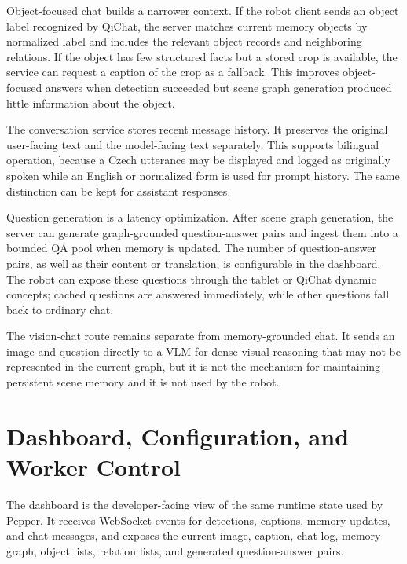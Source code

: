 Object-focused chat builds a narrower context.
If the robot client sends an object label recognized by QiChat, the server matches current memory objects by normalized label and includes the relevant object records and neighboring relations.
If the object has few structured facts but a stored crop is available, the service can request a caption of the crop as a fallback.
This improves object-focused answers when detection succeeded but scene graph generation produced little information about the object.

The conversation service stores recent message history.
It preserves the original user-facing text and the model-facing text separately.
This supports bilingual operation, because a Czech utterance may be displayed and logged as originally spoken while an English or normalized form is used for prompt history.
The same distinction can be kept for assistant responses.

Question generation is a latency optimization.
After scene graph generation, the server can generate graph-grounded question-answer pairs and ingest them into a bounded QA pool when memory is updated. The number of question-answer pairs, as well as their content or translation, is configurable in the dashboard.
The robot can expose these questions through the tablet or QiChat dynamic concepts; cached questions are answered immediately, while other questions fall back to ordinary chat.

The vision-chat route remains separate from memory-grounded chat.
It sends an image and question directly to a VLM for dense visual reasoning that may not be represented in the current graph, but it is not the mechanism for maintaining persistent scene memory and it is not used by the robot.

\section{Dashboard, Configuration, and Worker Control}\label{sec:server-dashboard}


The dashboard is the developer-facing view of the same runtime state used by Pepper.
It receives WebSocket events for detections, captions, memory updates, and chat messages, and exposes the current image, caption, chat log, memory graph, object lists, relation lists, and generated question-answer pairs.

